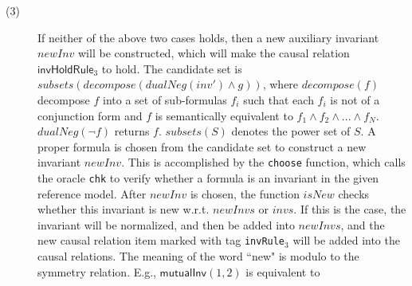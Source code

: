 \documentclass[final]{IEEEtran}
\def \eqc {=}
\def \andc {\wedge }
\def \negc {\lnot}
\begin{document}
\begin{description}
\item[(3)] If neither of the above two cases holds, then a new auxiliary invariant $newInv$ will be constructed, which will make the causal relation $ \mathsf{invHoldRule}_3$  to hold. The candidate set is $subsets(decompose(dualNeg(inv')\andc g))$, where $decompose(f)$ decompose $f$ into a set of sub-formulas $f_i$  such that each $f_i$ is not of a conjunction form and $f$   is semantically equivalent to $f_1 \andc f_2 \andc ... \andc f_N$. $dualNeg(\negc f)$ returns $f$. $subsets(S)$ denotes the power set of $S$.
A proper formula is chosen from the candidate set to construct a new invariant $newInv$. This is accomplished by the {\tt choose} function, which calls the oracle {\tt chk} to verify whether a formula is an invariant in the given reference model. After $newInv$ is chosen, the function $isNew$ checks whether this invariant is new w.r.t. $newInvs$ or $invs$. If this is the case, the invariant will be normalized, and then be  added into $newInvs$, and the new causal relation item marked with tag {\tt invRule$_3$} will be added into the causal relations. The meaning of the word ``new" is modulo to the symmetry relation. E.g., $\mathsf{mutualInv}(1,2)$ is equivalent to

\end{description}
\end{document}
